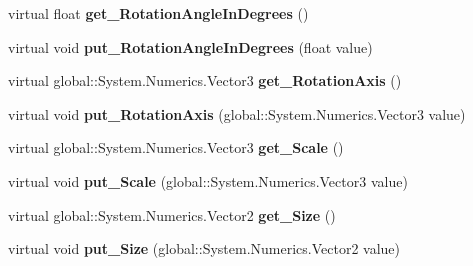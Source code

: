 \begin{DoxyCompactItemize}
\item 
\mbox{\label{class_windows_1_1_u_i_1_1_composition_1_1_visual_a6afa235bbf0eda06c026297cadc1b005}} 
virtual float {\bfseries get\+\_\+\+Rotation\+Angle\+In\+Degrees} ()
\item 
\mbox{\label{class_windows_1_1_u_i_1_1_composition_1_1_visual_ab913ab76eea8338f04b946c0fa8e8df1}} 
virtual void {\bfseries put\+\_\+\+Rotation\+Angle\+In\+Degrees} (float value)
\item 
\mbox{\label{class_windows_1_1_u_i_1_1_composition_1_1_visual_ae2a10f0e80dbd715f4a46226c4e1c6c0}} 
virtual global\+::\+System.\+Numerics.\+Vector3 {\bfseries get\+\_\+\+Rotation\+Axis} ()
\item 
\mbox{\label{class_windows_1_1_u_i_1_1_composition_1_1_visual_a7205a644c2e54e0465bfc32dff2ba814}} 
virtual void {\bfseries put\+\_\+\+Rotation\+Axis} (global\+::\+System.\+Numerics.\+Vector3 value)
\item 
\mbox{\label{class_windows_1_1_u_i_1_1_composition_1_1_visual_a35b342e278a4e2eee8f7e447d88c1043}} 
virtual global\+::\+System.\+Numerics.\+Vector3 {\bfseries get\+\_\+\+Scale} ()
\item 
\mbox{\label{class_windows_1_1_u_i_1_1_composition_1_1_visual_a7d09090c17f01920bb97e02f119cc78f}} 
virtual void {\bfseries put\+\_\+\+Scale} (global\+::\+System.\+Numerics.\+Vector3 value)
\item 
\mbox{\label{class_windows_1_1_u_i_1_1_composition_1_1_visual_aac55aa21f6e472aab4a33831d9e4ea2a}} 
virtual global\+::\+System.\+Numerics.\+Vector2 {\bfseries get\+\_\+\+Size} ()
\item 
\mbox{\label{class_windows_1_1_u_i_1_1_composition_1_1_visual_a00b77bc75500670531a48399d03ffe1d}} 
virtual void {\bfseries put\+\_\+\+Size} (global\+::\+System.\+Numerics.\+Vector2 value)

\end{DoxyCompactItemize}
